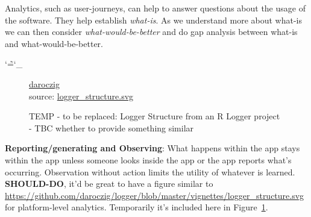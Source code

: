 Analytics, such as user-journeys, can help to answer questions about the usage of the software. They help establish \emph{what-is}. As we understand more about what-is we can then consider \emph{what-would-be-better} and do gap analysis between what-is and what-would-be-better.

\makeatletter
\DeclareRobustCommand*{\escapeus}[1]{%
    \begingroup\@activeus\scantokens{#1\endinput}\endgroup}
\begingroup\lccode`\~=`\_\relax
    \lowercase{\endgroup\def\@activeus{\catcode`\_=\active \let~\_}}
\makeatother

\begin{figure}
\centering
    \copyrightbox[r]{
        \escapeus{}}
    {\textcopyright \href{{https://twitter.com/daroczig}}{daroczig}\\source: \href{https://github.com/daroczig/logger/blob/master/vignettes/logger\_structure.svg}{logger\_structure.svg}}
    \caption{TEMP - to be replaced: Logger Structure from an R Logger project - TBC whether to provide something similar}
    \label{fig:temp_logger_structure}
\end{figure}

\textbf{Reporting/generating and Observing}: What happens within the app stays within the app unless someone looks inside the app or the app reports what's occurring. Observation without action limits the utility of whatever is learned.  \textbf{SHOULD-DO}, it'd be great to have a figure similar to \url{https://github.com/daroczig/logger/blob/master/vignettes/logger_structure.svg} for platform-level analytics. Temporarily it's included here in Figure~\ref{fig:temp_logger_structure}.


